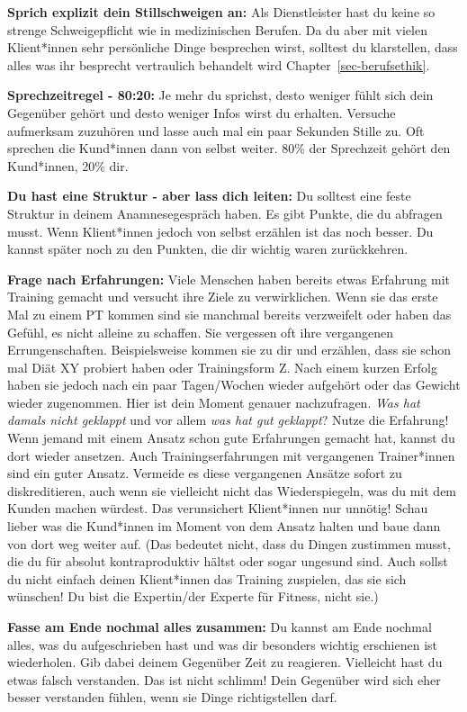 \documentclass[
  letterpaper,
  DIV=11,
  numbers=noendperiod]{scrreprt}
\begin{document}
\textbf{Sprich explizit dein Stillschweigen an:} Als Dienstleister hast
du keine so strenge Schweigepflicht wie in medizinischen Berufen. Da du
aber mit vielen Klient*innen sehr persönliche Dinge besprechen wirst,
solltest du klarstellen, dass alles was ihr besprecht vertraulich
behandelt wird Chapter~\ref{sec-berufsethik}.

\textbf{Sprechzeitregel - 80:20:} Je mehr du sprichst, desto weniger
fühlt sich dein Gegenüber gehört und desto weniger Infos wirst du
erhalten. Versuche aufmerksam zuzuhören und lasse auch mal ein paar
Sekunden Stille zu. Oft sprechen die Kund*innen dann von selbst weiter.
80\% der Sprechzeit gehört den Kund*innen, 20\% dir.

\textbf{Du hast eine Struktur - aber lass dich leiten:} Du solltest eine
feste Struktur in deinem Anamnesegespräch haben. Es gibt Punkte, die du
abfragen musst. Wenn Klient*innen jedoch von selbst erzählen ist das
noch besser. Du kannst später noch zu den Punkten, die dir wichtig waren
zurückkehren.

\textbf{Frage nach Erfahrungen:} Viele Menschen haben bereits etwas
Erfahrung mit Training gemacht und versucht ihre Ziele zu verwirklichen.
Wenn sie das erste Mal zu einem PT kommen sind sie manchmal bereits
verzweifelt oder haben das Gefühl, es nicht alleine zu schaffen. Sie
vergessen oft ihre vergangenen Errungenschaften. Beispielsweise kommen
sie zu dir und erzählen, dass sie schon mal Diät XY probiert haben oder
Trainingsform Z. Nach einem kurzen Erfolg haben sie jedoch nach ein paar
Tagen/Wochen wieder aufgehört oder das Gewicht wieder zugenommen. Hier
ist dein Moment genauer nachzufragen. \emph{Was hat damals nicht
geklappt} und vor allem \emph{was hat gut geklappt}? Nutze die
Erfahrung! Wenn jemand mit einem Ansatz schon gute Erfahrungen gemacht
hat, kannst du dort wieder ansetzen. Auch Trainingserfahrungen mit
vergangenen Trainer*innen sind ein guter Ansatz. Vermeide es diese
vergangenen Ansätze sofort zu diskreditieren, auch wenn sie vielleicht
nicht das Wiederspiegeln, was du mit dem Kunden machen würdest. Das
verunsichert Klient*innen nur unnötig! Schau lieber was die Kund*innen
im Moment von dem Ansatz halten und baue dann von dort weg weiter auf.
(Das bedeutet nicht, dass du Dingen zustimmen musst, die du für absolut
kontraproduktiv hältst oder sogar ungesund sind. Auch sollst du nicht
einfach deinen Klient*innen das Training zuspielen, das sie sich
wünschen! Du bist die Expertin/der Experte für Fitness, nicht sie.)

\textbf{Fasse am Ende nochmal alles zusammen:} Du kannst am Ende nochmal
alles, was du aufgeschrieben hast und was dir besonders wichtig
erschienen ist wiederholen. Gib dabei deinem Gegenüber Zeit zu
reagieren. Vielleicht hast du etwas falsch verstanden. Das ist nicht
schlimm! Dein Gegenüber wird sich eher besser verstanden fühlen, wenn
sie Dinge richtigstellen darf.
\end{document}
